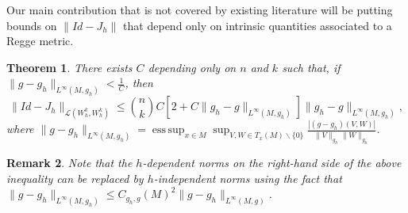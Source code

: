 \documentclass[11pt]{article}
\newtheorem{theorem}{Theorem}
\newtheorem{remark}[theorem]{Remark}
\DeclareMathOperator*{\esssup}{ess\,sup}
\begin{document}
Our main contribution that is not covered by existing literature will be putting bounds on $\|Id - J_h\|$ that depend only on intrinsic quantities associated to a Regge metric.
\begin{theorem}
\label{Jhbounds}
There exists $C$ depending only on $n$ and $k$ such that, if $\|g - g_h\|_{L^\infty(M,g_h)} < \frac{1}{C}$, then
\begin{equation}\|Id - J_h\|_{\mathcal{L}(W_h^k,W_h^k)} \le {n \choose k} C\left[2 + C\|g_h - g\|_{L^\infty(M,g_h)}\right]\|g_h - g\|_{L^\infty(M,g_h)},\end{equation}
where $\|g - g_h\|_{L^\infty(M,g_h)} = \esssup_{x \in M}\sup_{V,W \in T_x(M) \backslash \{0\}} \frac{|(g - g_h)(V,W)|}{\|V\|_{g_h}\|W\|_{g_h}}$.

\end{theorem}
\begin{remark}
Note that the $h$-dependent norms on the right-hand side of the above inequality can be replaced by $h$-independent norms using the fact that $\|g - g_h\|_{L^\infty(M,g_h)} \le C_{g_h,g}(M)^2\|g - g_h\|_{L^\infty(M,g)}$.
\end{remark}
\end{document}
